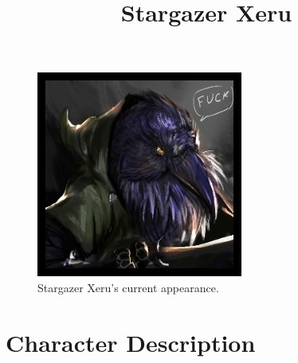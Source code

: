 \documentclass[12pt]{article}
\begin{document}
 
\title{Stargazer Xeru}
\date{}

\maketitle


\begin{figure}[H]
  \centering
  \includegraphics[width=.7\textwidth]{./resources/Stargazer_Xeru}
  \caption{Stargazer Xeru's current appearance.}
\end{figure}

\clearpage

\section{Character Description}
\end{document}
